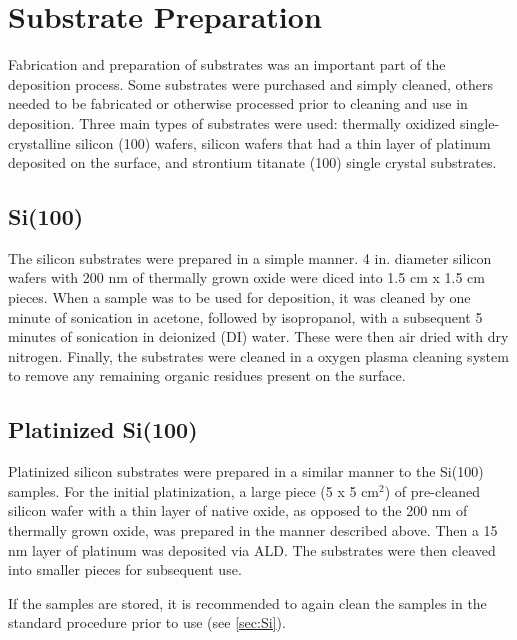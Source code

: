 \section{Substrate Preparation}
\label{sec:SampFab-Substrates}

Fabrication and preparation of substrates was an important part of the deposition process. Some substrates were purchased and simply cleaned, others needed to be fabricated or otherwise processed prior to cleaning and use in deposition. Three main types of substrates were used: thermally oxidized single-crystalline silicon (100) wafers, silicon wafers that had a thin layer of platinum deposited on the surface, and strontium titanate (100) single crystal substrates. 

\subsection{Si(100)} \label{sec:Si}

The silicon substrates were prepared in a simple manner. 4 in. diameter silicon wafers with 200 nm of thermally grown oxide were diced into 1.5 cm x 1.5 cm pieces. When a sample was to be used for deposition, it was cleaned by one minute of sonication in acetone, followed by isopropanol, with a subsequent 5 minutes of sonication in deionized (DI) water. These were then air dried with dry nitrogen. Finally, the substrates were cleaned in a oxygen plasma cleaning system to remove any remaining organic residues present on the surface.\cite{kern_handbook_1993} 



\subsection{Platinized Si(100)}

Platinized silicon substrates were prepared in a similar manner to the Si(100) samples. For the initial platinization, a large piece (5 x 5 cm$^{2}$) of pre-cleaned silicon wafer with a thin layer of native oxide, as opposed to the 200 nm of thermally grown oxide, was prepared in the manner described above.\cite{kern_handbook_1993} Then a 15 nm layer of platinum was deposited via ALD.\cite{Ritala_2003_Pt} The substrates were then cleaved into smaller pieces for subsequent use. 

If the samples are stored, it is recommended to again clean the samples in the standard procedure prior to use (see \vref{sec:Si}).

